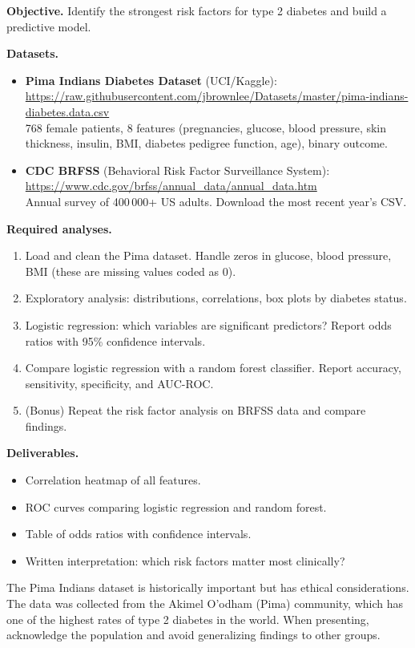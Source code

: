 \textbf{Objective.} Identify the strongest risk factors for type 2 diabetes and build a predictive model.

\textbf{Datasets.}
\begin{itemize}
  \item \textbf{Pima Indians Diabetes Dataset} (UCI/Kaggle):\\
  \url{https://raw.githubusercontent.com/jbrownlee/Datasets/master/pima-indians-diabetes.data.csv}\\
  768 female patients, 8 features (pregnancies, glucose, blood pressure, skin thickness, insulin, BMI, diabetes pedigree function, age), binary outcome.
  \item \textbf{CDC BRFSS} (Behavioral Risk Factor Surveillance System):\\
  \url{https://www.cdc.gov/brfss/annual_data/annual_data.htm}\\
  Annual survey of 400\,000+ US adults. Download the most recent year's CSV.
\end{itemize}

\textbf{Required analyses.}
\begin{enumerate}
  \item Load and clean the Pima dataset. Handle zeros in glucose, blood pressure, BMI (these are missing values coded as 0).
  \item Exploratory analysis: distributions, correlations, box plots by diabetes status.
  \item Logistic regression: which variables are significant predictors? Report odds ratios with 95\% confidence intervals.
  \item Compare logistic regression with a random forest classifier. Report accuracy, sensitivity, specificity, and AUC-ROC.
  \item (Bonus) Repeat the risk factor analysis on BRFSS data and compare findings.
\end{enumerate}

\textbf{Deliverables.}
\begin{itemize}
  \item Correlation heatmap of all features.
  \item ROC curves comparing logistic regression and random forest.
  \item Table of odds ratios with confidence intervals.
  \item Written interpretation: which risk factors matter most clinically?
\end{itemize}

\begin{clinicalnote}
The Pima Indians dataset is historically important but has ethical considerations. The data was collected from the Akimel O'odham (Pima) community, which has one of the highest rates of type 2 diabetes in the world. When presenting, acknowledge the population and avoid generalizing findings to other groups.
\end{clinicalnote}

